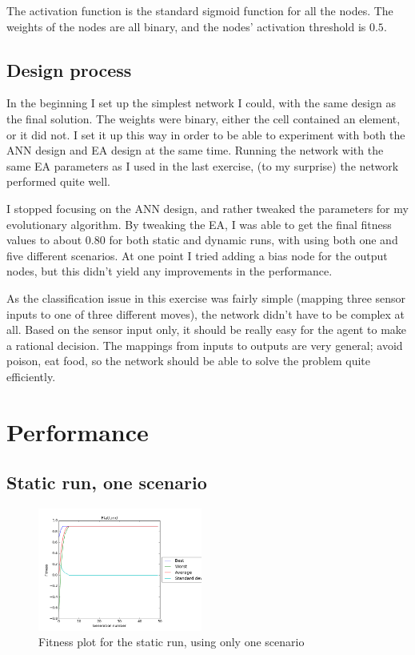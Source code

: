 \documentclass[
]{article}
\begin{document}
The activation function is the standard sigmoid function for all the nodes. The weights of the nodes are all binary, and the nodes' activation threshold is $0.5$.

\subsection{Design process}
In the beginning I set up the simplest network I could, with the same design as the final solution. The weights were binary, either the cell contained an element, or it did not. I set it up this way in order to be able to experiment with both the ANN design and EA design at the same time. Running the network with the same EA parameters as I used in the last exercise, (to my surprise) the network performed quite well.

I stopped focusing on the ANN design, and rather tweaked the parameters for my evolutionary algorithm. By tweaking the EA, I was able to get the final fitness values to about $0.80$ for both static and dynamic runs, with using both one and five different scenarios. At one point I tried adding a bias node for the output nodes, but this didn't yield any improvements in the performance.

As the classification issue in this exercise was fairly simple (mapping three sensor inputs to one of three different moves), the network didn't have to be complex at all. Based on the sensor input only, it should be really easy for the agent to make a rational decision. The mappings from inputs to outputs are very general; avoid poison, eat food, so the network should be able to solve the problem quite efficiently.


\section{Performance}
\subsection{Static run, one scenario}

\begin{figure}
  \begin{center}
    \includegraphics[width=0.48\textwidth]{static_one_static.png}
  \end{center}
  \caption{Fitness plot for the static run, using only one scenario}
  \label{fig:static_one}
\end{figure}
\end{document}
